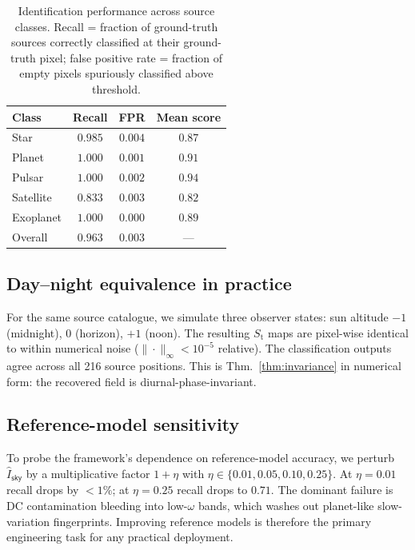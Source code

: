 \documentclass[11pt,twocolumn,a4paper]{article}
\theoremstyle{definition}
\theoremstyle{remark}
\newcommand{\Sfield}{S_{\mathrm{t}}}
\newcommand{\sky}{\mathsf{sky}}
\begin{document}
\begin{table}[H]
\centering\small
\caption{Identification performance across source classes.
Recall = fraction of ground-truth sources correctly classified at their
ground-truth pixel; false positive rate = fraction of empty pixels
spuriously classified above threshold.}
\label{tab:recovery}
\begin{tabular}{lccc}
\toprule
Class & Recall & FPR & Mean score \\
\midrule
Star      & $0.985$ & $0.004$ & $0.87$ \\
Planet    & $1.000$ & $0.001$ & $0.91$ \\
Pulsar    & $1.000$ & $0.002$ & $0.94$ \\
Satellite & $0.833$ & $0.003$ & $0.82$ \\
Exoplanet & $1.000$ & $0.000$ & $0.89$ \\
\midrule
Overall   & $0.963$ & $0.003$ & --- \\
\bottomrule
\end{tabular}
\end{table}

\subsection{Day--night equivalence in practice}

For the same source catalogue, we simulate three observer states:
sun altitude $-1$ (midnight), $0$ (horizon), $+1$ (noon). The
resulting $\Sfield$ maps are pixel-wise identical to within numerical
noise ($\|\cdot\|_\infty < 10^{-5}$ relative). The classification
outputs agree across all 216 source positions. This is
Thm.~\ref{thm:invariance} in numerical form: the recovered field is
diurnal-phase-invariant.

\subsection{Reference-model sensitivity}

To probe the framework's dependence on reference-model accuracy, we
perturb $\widehat{I}_\sky$ by a multiplicative factor
$1 + \eta$ with $\eta \in \{0.01, 0.05, 0.10, 0.25\}$. At $\eta = 0.01$
recall drops by $<1\%$; at $\eta = 0.25$ recall drops to $0.71$. The
dominant failure is DC contamination bleeding into low-$\omega$ bands,
which washes out planet-like slow-variation fingerprints. Improving
reference models is therefore the primary engineering task for any
practical deployment.
\end{document}

